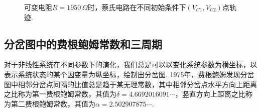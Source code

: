\documentclass[a4paper, 10pt]{article}
\begin{document}
\begin{multicols*}{2}
\begin{figure}[H]
    \centering
    \caption{可变电阻$R=1950\,\Omega$时，蔡氏电路在不同初始条件下$(V_{C1},V_{C2})$点轨迹.}
    \label{InitialConditionSensitivity}
\end{figure}

\subsection{分岔图中的费根鲍姆常数和三周期}
对于非线性系统在不同参数下的演化，我们总是可以以变化系统参数为横坐标，以表示系统状态的某个因变量为纵坐标，绘制出分岔图. 1975年，费根鲍姆发现分岔图中相邻分岔点间隔的比值总是趋于某无理常数，其中相邻分岔点水平方向上距离之比称为第一费根鲍姆常数，其值为$\delta=4.6692016091\cdots$，竖直方向上距离之比称为第二费根鲍姆常数，其值为$\alpha=2.502907875\cdots$.


\end{multicols*}
\end{document}
